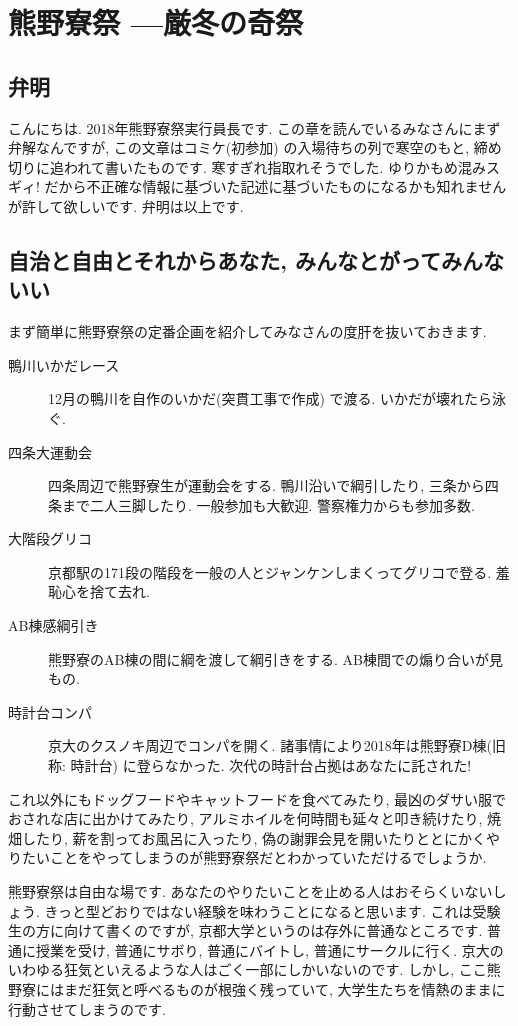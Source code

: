 \documentclass[10pt,b5jsbook,dvips,dvipdfmx,openany]{jsbook}
\theoremstyle{definition}
\begin{document}
\newpage

	\section{熊野寮祭 ---厳冬の奇祭}
			\subsection{弁明}
			こんにちは. 2018年熊野寮祭実行員長です. この章を読んでいるみなさんにまず弁解なんですが, この文章はコミケ(初参加) の入場待ちの列で寒空のもと, 締め切りに追われて書いたものです. 寒すぎれ指取れそうでした. ゆりかもめ混みスギィ! だから不正確な情報に基づいた記述に基づいたものになるかも知れませんが許して欲しいです. 弁明は以上です.

			\subsection{自治と自由とそれからあなた, みんなとがってみんないい}
			まず簡単に熊野寮祭の定番企画を紹介してみなさんの度肝を抜いておきます.
			\begin{description}
			\item[鴨川いかだレース] 12月の鴨川を自作のいかだ(突貫工事で作成) で渡る. いかだが壊れたら泳ぐ.
			\item[四条大運動会] 四条周辺で熊野寮生が運動会をする. 鴨川沿いで綱引したり, 三条から四条まで二人三脚したり. 一般参加も大歓迎. 警察権力からも参加多数.
			\item[大階段グリコ] 京都駅の171段の階段を一般の人とジャンケンしまくってグリコで登る. 羞恥心を捨て去れ.
			\item[AB棟感綱引き]熊野寮のAB棟の間に綱を渡して綱引きをする. AB棟間での煽り合いが見もの.
			\item[時計台コンパ]京大のクスノキ周辺でコンパを開く. 諸事情により2018年は熊野寮D棟(旧称: 時計台) に登らなかった. 次代の時計台占拠はあなたに託された!
			\end{description}

			これ以外にもドッグフードやキャットフードを食べてみたり, 最凶のダサい服でおされな店に出かけてみたり, アルミホイルを何時間も延々と叩き続けたり, 焼畑したり, 薪を割ってお風呂に入ったり, 偽の謝罪会見を開いたりととにかくやりたいことをやってしまうのが熊野寮祭だとわかっていただけるでしょうか.

			熊野寮祭は自由な場です. あなたのやりたいことを止める人はおそらくいないしょう. きっと型どおりではない経験を味わうことになると思います. これは受験生の方に向けて書くのですが, 京都大学というのは存外に普通なところです. 普通に授業を受け, 普通にサボり, 普通にバイトし, 普通にサークルに行く. 京大のいわゆる狂気といえるような人はごく一部にしかいないのです. しかし, ここ熊野寮にはまだ狂気と呼べるものが根強く残っていて, 大学生たちを情熱のままに行動させてしまうのです.
\end{document}
